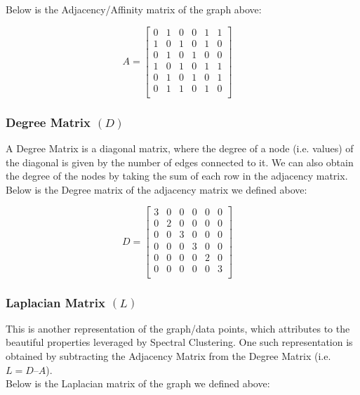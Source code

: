 \documentclass{article}
\begin{document}
        \noindent Below is the Adjacency/Affinity matrix of the graph above:
        
        $$ A = 
    	\begin{bmatrix} 
    	0 & 1 & 0 & 0 & 1 & 1 \\
    	1 & 0 & 1 & 0 & 1 & 0 \\
    	0 & 1 & 0 & 1 & 0 & 0 \\
     	1 & 0 & 1 & 0 & 1 & 1 \\
      	0 & 1 & 0 & 1 & 0 & 1 \\
       	0 & 1 & 1 & 0 & 1 & 0 \\
    	\end{bmatrix}
    	\quad
        $$
        \subsubsection{Degree Matrix $(D)$}
        A Degree Matrix is a diagonal matrix, where the degree of a node (i.e. values) of the diagonal is given by the number of edges connected to it. We can also obtain the degree of the nodes by taking the sum of each row in the adjacency matrix.\\
        
        \noindent Below is the Degree matrix of the adjacency matrix we defined above:
        
        $$ D = 
    	\begin{bmatrix} 
    	3 & 0 & 0 & 0 & 0 & 0 \\
    	0 & 2 & 0 & 0 & 0 & 0 \\
    	0 & 0 & 3 & 0 & 0 & 0 \\
     	0 & 0 & 0 & 3 & 0 & 0 \\
      	0 & 0 & 0 & 0 & 2 & 0 \\
       	0 & 0 & 0 & 0 & 0 & 3 \\
    	\end{bmatrix}
    	\quad
        $$
        \subsubsection{Laplacian Matrix $(L)$}
        This is another representation of the graph/data points, which attributes to the beautiful properties leveraged by Spectral Clustering. One such representation is obtained by subtracting the Adjacency Matrix from the Degree Matrix (i.e. $L = D – A$).
        \\
        
        \noindent Below is the Laplacian matrix of the graph we defined above:
        
\end{document}
